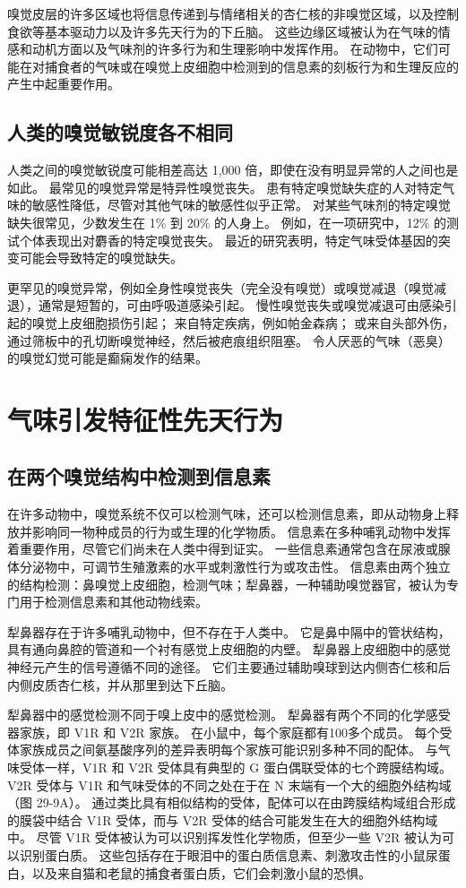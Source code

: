 嗅觉皮层的许多区域也将信息传递到与情绪相关的杏仁核的非嗅觉区域，以及控制食欲等基本驱动力以及许多先天行为的下丘脑。 这些边缘区域被认为在气味的情感和动机方面以及气味剂的许多行为和生理影响中发挥作用。 在动物中，它们可能在对捕食者的气味或在嗅觉上皮细胞中检测到的信息素的刻板行为和生理反应的产生中起重要作用。


\subsection{人类的嗅觉敏锐度各不相同}
人类之间的嗅觉敏锐度可能相差高达 1,000 倍，即使在没有明显异常的人之间也是如此。 最常见的嗅觉异常是特异性嗅觉丧失。 患有特定嗅觉缺失症的人对特定气味的敏感性降低，尽管对其他气味的敏感性似乎正常。 对某些气味剂的特定嗅觉缺失很常见，少数发生在 1\% 到 20\% 的人身上。 例如，在一项研究中，12\% 的测试个体表现出对麝香的特定嗅觉丧失。 最近的研究表明，特定气味受体基因的突变可能会导致特定的嗅觉缺失。

更罕见的嗅觉异常，例如全身性嗅觉丧失（完全没有嗅觉）或嗅觉减退（嗅觉减退），通常是短暂的，可由呼吸道感染引起。 慢性嗅觉丧失或嗅觉减退可由感染引起的嗅觉上皮细胞损伤引起； 来自特定疾病，例如帕金森病； 或来自头部外伤，通过筛板中的孔切断嗅觉神经，然后被疤痕组织阻塞。 令人厌恶的气味（恶臭）的嗅觉幻觉可能是癫痫发作的结果。



\section{气味引发特征性先天行为}


\subsection{在两个嗅觉结构中检测到信息素}
在许多动物中，嗅觉系统不仅可以检测气味，还可以检测信息素，即从动物身上释放并影响同一物种成员的行为或生理的化学物质。 信息素在多种哺乳动物中发挥着重要作用，尽管它们尚未在人类中得到证实。 一些信息素通常包含在尿液或腺体分泌物中，可调节生殖激素的水平或刺激性行为或攻击性。 信息素由两个独立的结构检测：鼻嗅觉上皮细胞，检测气味；犁鼻器，一种辅助嗅觉器官，被认为专门用于检测信息素和其他动物线索。

犁鼻器存在于许多哺乳动物中，但不存在于人类中。 它是鼻中隔中的管状结构，具有通向鼻腔的管道和一个衬有感觉上皮细胞的内壁。 犁鼻器上皮细胞中的感觉神经元产生的信号遵循不同的途径。 它们主要通过辅助嗅球到达内侧杏仁核和后内侧皮质杏仁核，并从那里到达下丘脑。

犁鼻器中的感觉检测不同于嗅上皮中的感觉检测。 犁鼻器有两个不同的化学感受器家族，即 V1R 和 V2R 家族。 在小鼠中，每个家庭都有100多个成员。 每个受体家族成员之间氨基酸序列的差异表明每个家族可能识别多种不同的配体。 与气味受体一样，V1R 和 V2R 受体具有典型的 G 蛋白偶联受体的七个跨膜结构域。 V2R 受体与 V1R 和气味受体的不同之处在于在 N 末端有一个大的细胞外结构域（图 29-9A）。 通过类比具有相似结构的受体，配体可以在由跨膜结构域组合形成的膜袋中结合 V1R 受体，而与 V2R 受体的结合可能发生在大的细胞外结构域中。 尽管 V1R 受体被认为可以识别挥发性化学物质，但至少一些 V2R 被认为可以识别蛋白质。 这些包括存在于眼泪中的蛋白质信息素、刺激攻击性的小鼠尿蛋白，以及来自猫和老鼠的捕食者蛋白质，它们会刺激小鼠的恐惧。


